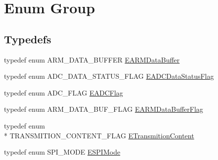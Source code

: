 \hypertarget{group___enum_grp}{\section{Enum Group}
\label{group___enum_grp}
}
\subsection*{Typedefs}
\begin{DoxyCompactItemize}
\item 
typedef enum A\-R\-M\-\_\-\-D\-A\-T\-A\-\_\-\-B\-U\-F\-F\-E\-R \hyperlink{group___enum_grp_ga0556af71c2e177b00bb1ec7741d36624}{E\-A\-R\-M\-Data\-Buffer}
\item 
typedef enum A\-D\-C\-\_\-\-D\-A\-T\-A\-\_\-\-S\-T\-A\-T\-U\-S\-\_\-\-F\-L\-A\-G \hyperlink{group___enum_grp_ga28f90ca377a944d61b5d7c95655e2d97}{E\-A\-D\-C\-Data\-Status\-Flag}
\item 
typedef enum A\-D\-C\-\_\-\-F\-L\-A\-G \hyperlink{group___enum_grp_ga7a77f876c6fae36cb97dfc3ba1e07665}{E\-A\-D\-C\-Flag}
\item 
typedef enum A\-R\-M\-\_\-\-D\-A\-T\-A\-\_\-\-B\-U\-F\-\_\-\-F\-L\-A\-G \hyperlink{group___enum_grp_gafa703983b61d6eddeeaca1f48ec61efc}{E\-A\-R\-M\-Data\-Buffer\-Flag}
\item 
typedef enum \\*
T\-R\-A\-N\-S\-M\-I\-T\-I\-O\-N\-\_\-\-C\-O\-N\-T\-E\-N\-T\-\_\-\-F\-L\-A\-G \hyperlink{group___enum_grp_ga1cca30b0867e98d31885e58f552270e0}{E\-Transmition\-Content}
\item 
typedef enum S\-P\-I\-\_\-\-M\-O\-D\-E \hyperlink{group___enum_grp_ga34cca0902b647bf356893ca1ee8d202b}{E\-S\-P\-I\-Mode}
\end{DoxyCompactItemize}
